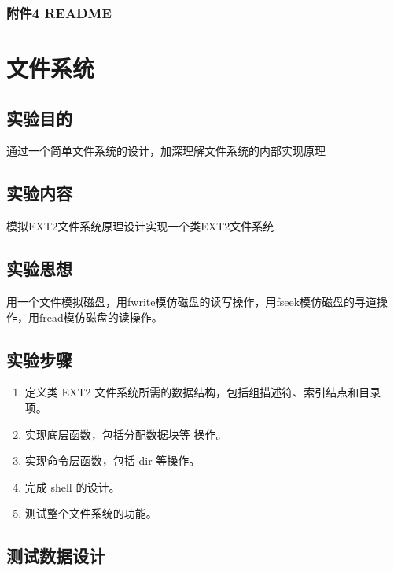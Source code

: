\documentclass{article}
\begin{document}
    \subsubsection{附件4 README}

     

    \newpage
    \section{文件系统}
    \subsection{实验目的}

    通过一个简单文件系统的设计，加深理解文件系统的内部实现原理


    \subsection{实验内容}

    模拟EXT2文件系统原理设计实现一个类EXT2文件系统

    \subsection{实验思想}

    用一个文件模拟磁盘，用fwrite模仿磁盘的读写操作，用fseek模仿磁盘的寻道操作，用fread模仿磁盘的读操作。

    \subsection{实验步骤}

    \begin{enumerate}
        \item 定义类 EXT2 文件系统所需的数据结构，包括组描述符、索引结点和目录项。
        \item 实现底层函数，包括分配数据块等 操作。
        \item 实现命令层函数，包括 dir 等操作。
        \item 完成 shell 的设计。
        \item 测试整个文件系统的功能。
    \end{enumerate}

    \subsection{测试数据设计}
\end{document}

